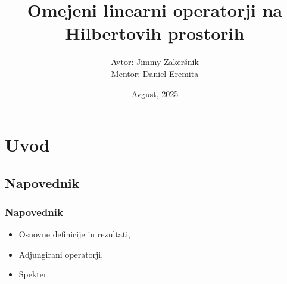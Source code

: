 \documentclass[beamer,t,envcountsect,notheorems]{beamer}%
\newenvironment{stepitemize}{\begin{itemize}[<+->]}{\end{itemize} }
\begin{document}

\title{Omejeni linearni operatorji na Hilbertovih prostorih}
\author{Avtor: Jimmy Zakeršnik \\Mentor: Daniel Eremita}
\date{Avgust, 2025}
\maketitle


\section{Uvod}

\subsection{Napovednik}%
\begin{frame}

\frametitle{Napovednik}%

\begin{stepitemize}%

\item Osnovne definicije in rezultati,
\item Adjungirani operatorji,
\item Spekter.

\end{stepitemize}%
\end{frame}%

\end{document}
